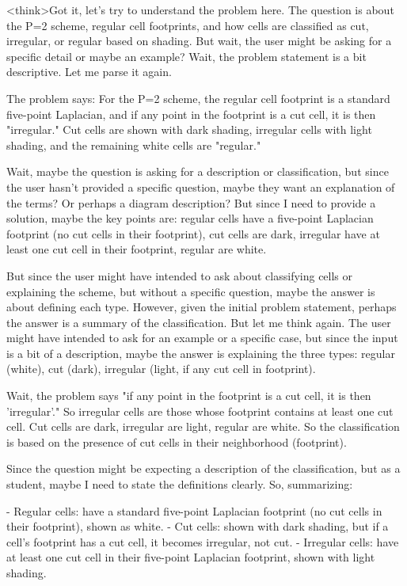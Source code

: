 <think>Got it, let's try to understand the problem here. The question is about the P=2 scheme, regular cell footprints, and how cells are classified as cut, irregular, or regular based on shading. But wait, the user might be asking for a specific detail or maybe an example? Wait, the problem statement is a bit descriptive. Let me parse it again.

The problem says: For the P=2 scheme, the regular cell footprint is a standard five-point Laplacian, and if any point in the footprint is a cut cell, it is then "irregular." Cut cells are shown with dark shading, irregular cells with light shading, and the remaining white cells are "regular." 

Wait, maybe the question is asking for a description or classification, but since the user hasn't provided a specific question, maybe they want an explanation of the terms? Or perhaps a diagram description? But since I need to provide a solution, maybe the key points are: regular cells have a five-point Laplacian footprint (no cut cells in their footprint), cut cells are dark, irregular have at least one cut cell in their footprint, regular are white. 

But since the user might have intended to ask about classifying cells or explaining the scheme, but without a specific question, maybe the answer is about defining each type. However, given the initial problem statement, perhaps the answer is a summary of the classification. But let me think again. The user might have intended to ask for an example or a specific case, but since the input is a bit of a description, maybe the answer is explaining the three types: regular (white), cut (dark), irregular (light, if any cut cell in footprint). 

Wait, the problem says "if any point in the footprint is a cut cell, it is then 'irregular'." So irregular cells are those whose footprint contains at least one cut cell. Cut cells are dark, irregular are light, regular are white. So the classification is based on the presence of cut cells in their neighborhood (footprint). 

Since the question might be expecting a description of the classification, but as a student, maybe I need to state the definitions clearly. So, summarizing:

- Regular cells: have a standard five-point Laplacian footprint (no cut cells in their footprint), shown as white.
- Cut cells: shown with dark shading, but if a cell's footprint has a cut cell, it becomes irregular, not cut.
- Irregular cells: have at least one cut cell in their five-point Laplacian footprint, shown with light shading.

